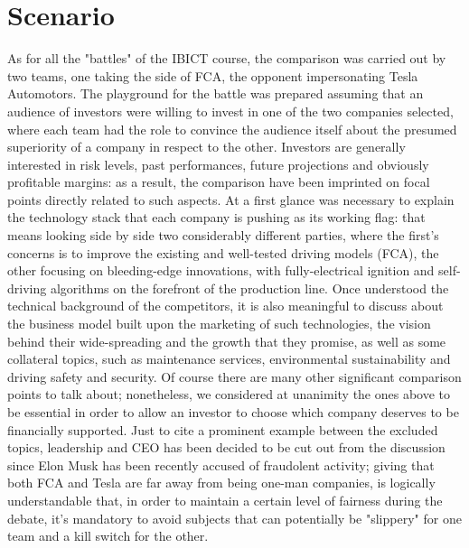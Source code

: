 \section{Scenario}

As for all the "battles" of the IBICT course, the comparison was carried out by two teams, one taking the side of FCA, the opponent impersonating Tesla Automotors.
The playground for the battle was prepared assuming that an audience of investors were willing to invest in one of the two companies selected, where each team had the role to convince the audience itself about the presumed superiority of a company in respect to the other.
Investors are generally interested in risk levels, past performances, future projections and obviously profitable margins: as a result, the comparison have been imprinted on focal points directly related to such aspects. At a first glance was necessary to explain the technology stack that each company is pushing as its working flag: that means looking side by side two considerably different parties, where the first's concerns is to improve the existing and well-tested driving models (FCA), the other focusing on bleeding-edge innovations, with fully-electrical ignition and self-driving algorithms on the forefront of the production line. Once understood the technical background of the competitors, it is also meaningful to discuss about the business model built upon the marketing of such technologies, the vision behind their wide-spreading and the growth that they promise, as well as some collateral topics, such as maintenance services, environmental sustainability and driving safety and security.
Of course there are many other significant comparison points to talk about; nonetheless, we considered at unanimity the ones above to be essential in order to allow an investor to choose which company deserves to be financially supported. Just to cite a prominent example between the excluded topics, leadership and CEO has been decided to be cut out from the discussion since Elon Musk has been recently accused of fraudolent activity; giving that both FCA and Tesla are far away from being one-man companies, is logically understandable that, in order to maintain a certain level of fairness during the debate, it's mandatory to avoid subjects that can potentially be "slippery" for one team and a kill switch for the other.


